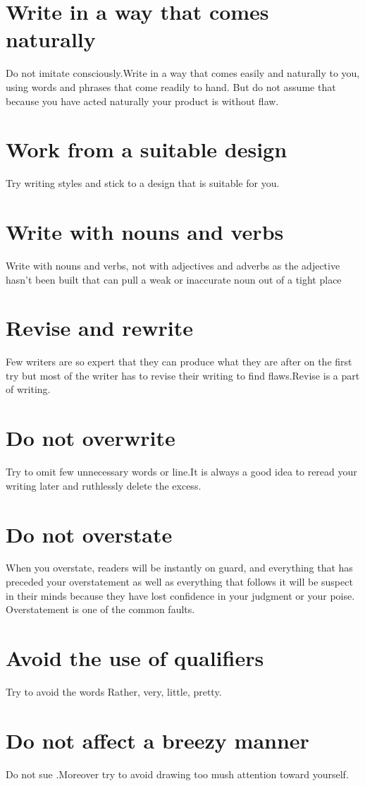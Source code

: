 \documentclass{report}
\begin{document}
\section{Write in a way that comes naturally}
Do not imitate consciously.Write in a way that comes easily and naturally to you, using words and phrases that come readily to hand. But do not assume that because you have acted naturally your product is without flaw.
\section{Work from a suitable design}
Try writing styles and stick to a design that is suitable for you.
\section{Write with nouns and verbs}
Write with nouns and verbs, not with adjectives and adverbs as the adjective hasn't been built that can pull a weak or inaccurate noun out of a tight place
\section{Revise and rewrite}
 Few writers are so expert that they can produce what they are after on the first try but most of the writer has to revise their writing to find flaws.Revise is a part of writing.
\section{ Do not overwrite}
Try to omit few unnecessary words or line.It is always a good idea to reread your writing later and ruthlessly delete the excess.
\section{Do not overstate}
When you overstate, readers will be instantly on guard, and everything that has preceded your overstatement as well as everything that follows it will be suspect in their minds because they have lost confidence in your judgment or your poise. Overstatement is one of the common faults.
\section{ Avoid the use of qualifiers}
Try to avoid the words Rather, very, little, pretty.
\section{Do not affect a breezy manner}
Do not sue .Moreover try to avoid drawing too mush attention toward yourself.
\end{document}
